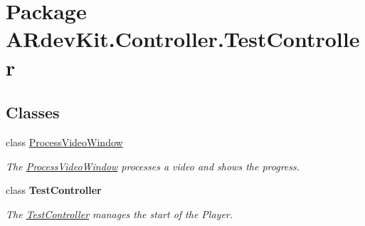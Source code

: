 \hypertarget{namespace_a_rdev_kit_1_1_controller_1_1_test_controller}{\section{Package A\-Rdev\-Kit.\-Controller.\-Test\-Controller}
\label{namespace_a_rdev_kit_1_1_controller_1_1_test_controller}
}
\subsection*{Classes}
\begin{DoxyCompactItemize}
\item 
class \hyperlink{class_a_rdev_kit_1_1_controller_1_1_test_controller_1_1_process_video_window}{Process\-Video\-Window}
\begin{DoxyCompactList}\small\item\em The \hyperlink{class_a_rdev_kit_1_1_controller_1_1_test_controller_1_1_process_video_window}{Process\-Video\-Window} processes a video and shows the progress. \end{DoxyCompactList}\item 
class {\bfseries Test\-Controller}
\begin{DoxyCompactList}\small\item\em The \hyperlink{namespace_a_rdev_kit_1_1_controller_1_1_test_controller}{Test\-Controller} manages the start of the Player. \end{DoxyCompactList}\end{DoxyCompactItemize}
